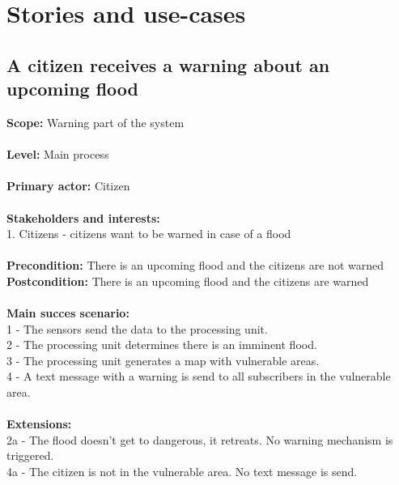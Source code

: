 \section{Stories and use-cases}
\subsection{A citizen receives a warning about an upcoming flood}
\textbf{Scope:} Warning part of the system\\\\
\textbf{Level:} Main process\\\\
\textbf{Primary actor:} Citizen\\\\
\textbf{Stakeholders and interests:}\\
	1. Citizens - citizens want to be warned in case of a flood \\\\
\textbf{Precondition:} There is an upcoming flood and the citizens are not warned\\
\textbf{Postcondition:} There is an upcoming flood and the citizens are warned\\\\
\textbf{Main succes scenario:} \\
1 - The sensors send the data to the processing unit.\\
2 - The processing unit determines there is an imminent flood.\\
3 - The processing unit generates a map with vulnerable areas.\\
4 - A text message with a warning is send to all subscribers in the vulnerable area.\\\\
\textbf{Extensions:} \\
2a - The flood doesn't get to dangerous, it retreats. No warning mechanism is triggered.\\
4a - The citizen is not in the vulnerable area. No text message is send.

